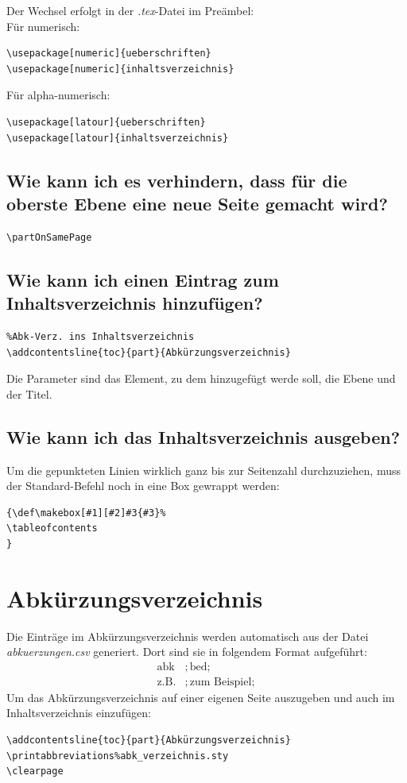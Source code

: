 \documentclass[12pt]{article}
\begin{document}
Der Wechsel erfolgt in der \textit{.tex}-Datei im Preämbel:\\[6pt]
Für numerisch:
\begin{verbatim}
\usepackage[numeric]{ueberschriften}
\usepackage[numeric]{inhaltsverzeichnis}
\end{verbatim}
Für alpha-numerisch:
\begin{verbatim}
\usepackage[latour]{ueberschriften}
\usepackage[latour]{inhaltsverzeichnis}
\end{verbatim}

\subsection{Wie kann ich es verhindern, dass für die oberste Ebene eine neue Seite gemacht wird?}
\begin{verbatim}
\partOnSamePage
\end{verbatim}

\subsection{Wie kann ich einen Eintrag zum Inhaltsverzeichnis hinzufügen?}
\begin{verbatim}
%Abk-Verz. ins Inhaltsverzeichnis
\addcontentsline{toc}{part}{Abkürzungsverzeichnis}
\end{verbatim}
Die Parameter sind das Element, zu dem hinzugefügt werde soll, die Ebene und der Titel.

\subsection{Wie kann ich das Inhaltsverzeichnis ausgeben?}
Um die gepunkteten Linien wirklich ganz bis zur Seitenzahl durchzuziehen, muss der Standard-Befehl noch in eine Box gewrappt werden:
\begin{verbatim}
{\def\makebox[#1][#2]#3{#3}%
\tableofcontents
}
\end{verbatim}

\section{Abkürzungsverzeichnis}
Die Einträge im Abkürzungsverzeichnis werden automatisch aus der Datei \textit{abkuerzungen.csv} generiert. Dort sind sie in folgendem Format aufgeführt:
\begin{align*}
\text{abk}&;\text{bed};\\
\text{z.B.} &;\text{zum Beispiel};
\end{align*}
\noindent Um das Abkürzungsverzeichnis auf einer eigenen Seite auszugeben und auch im Inhaltsverzeichnis einzufügen:
\begin{verbatim}
\addcontentsline{toc}{part}{Abkürzungsverzeichnis}
\printabbreviations%abk_verzeichnis.sty
\clearpage
\end{verbatim}
\end{document}
